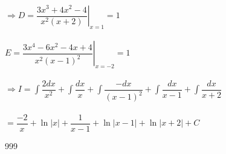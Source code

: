 \documentclass[a4paper]{article}
\begin{document}
$\Rightarrow D = \left. \dfrac{3x^3+4x^2-4}{x^2(x+2)}\right|_{x=1} = 1$\\\\

$E = \left. \dfrac{3x^4-6x^2-4x+4}{x^2(x-1)^2} \right|_{x=-2} = 1$\\\\

$\Rightarrow I = \displaystyle\int \dfrac{2dx}{x^2} + \displaystyle\int \dfrac{dx}{x} + \displaystyle\int \dfrac{-dx}{(x-1)^2} + \displaystyle\int \dfrac{dx}{x-1} + \displaystyle\int \dfrac{dx}{x+2}$\\\\

$= \dfrac{-2}{x} + \ln|x| + \dfrac{1}{x-1} + \ln|x-1| + \ln|x+2| + C$
\begin{thebibliography}{999}
\end{thebibliography}
\end{document}
